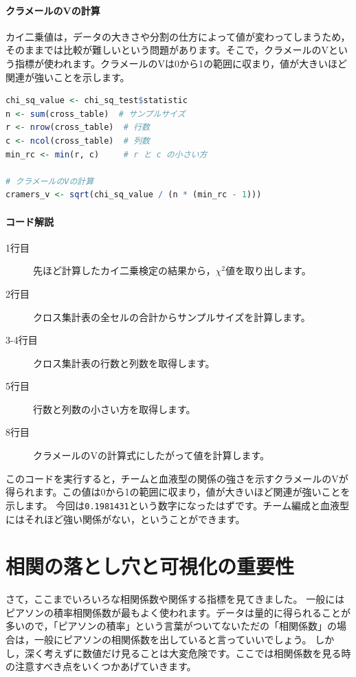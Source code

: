 \documentclass{ltjsbook}
\begin{document}
\paragraph{クラメールのVの計算}
カイ二乗値は，データの大きさや分割の仕方によって値が変わってしまうため，そのままでは比較が難しいという問題があります。そこで，クラメールのVという指標が使われます。クラメールのVは0から1の範囲に収まり，値が大きいほど関連が強いことを示します。

\begin{lstlisting}[language=R,label={code:06_09},caption={クラメールのVの計算}]
chi_sq_value <- chi_sq_test$statistic
n <- sum(cross_table)  # サンプルサイズ
r <- nrow(cross_table)  # 行数
c <- ncol(cross_table)  # 列数
min_rc <- min(r, c)     # r と c の小さい方

# クラメールのVの計算
cramers_v <- sqrt(chi_sq_value / (n * (min_rc - 1)))
\end{lstlisting}

\paragraph{コード解説}
\begin{description}
    \item[1行目] 先ほど計算したカイ二乗検定の結果から，$\chi^2$値を取り出します。
    \item[2行目] クロス集計表の全セルの合計からサンプルサイズを計算します。
    \item[3-4行目] クロス集計表の行数と列数を取得します。
    \item[5行目] 行数と列数の小さい方を取得します。
    \item[8行目] クラメールのVの計算式にしたがって値を計算します。
\end{description}

このコードを実行すると，チームと血液型の関係の強さを示すクラメールのVが得られます。この値は0から1の範囲に収まり，値が大きいほど関連が強いことを示します。
今回は\verb|0.1981431|という数字になったはずです。チーム編成と血液型にはそれほど強い関係がない，ということができます。

\section{相関の落とし穴と可視化の重要性}
さて，ここまでいろいろな相関係数や関係する指標を見てきました。
一般にはピアソンの積率相関係数が最もよく使われます。データは量的に得られることが多いので，「ピアソンの積率」という言葉がついてないただの「相関係数」の場合は，一般にピアソンの相関係数を出していると言っていいでしょう。
しかし，深く考えずに数値だけ見ることは大変危険です。ここでは相関係数を見る時の注意すべき点をいくつかあげていきます。
\end{document}
